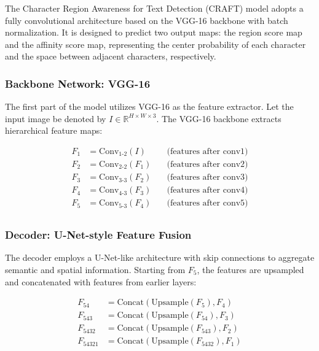 {The Character Region Awareness for Text Detection (CRAFT) model adopts a fully convolutional architecture based on the VGG-16 backbone with batch normalization. It is designed to predict two output maps: the region score map and the affinity score map, representing the center probability of each character and the space between adjacent characters, respectively.

\subsubsection*{Backbone Network: VGG-16}

The first part of the model utilizes VGG-16 \cite{Simonyan} 
as the feature extractor. Let the input image be denoted by 
$I \in \mathbb{R}^{H \times W \times 3}$. The VGG-16 backbone extracts 
hierarchical feature maps:

\[
\begin{aligned}
F_1 &= \text{Conv}_{1\text{-}2}(I) \quad &\text{(features after conv1)} \\
F_2 &= \text{Conv}_{2\text{-}2}(F_1) \quad &\text{(features after conv2)} \\
F_3 &= \text{Conv}_{3\text{-}3}(F_2) \quad &\text{(features after conv3)} \\
F_4 &= \text{Conv}_{4\text{-}3}(F_3) \quad &\text{(features after conv4)} \\
F_5 &= \text{Conv}_{5\text{-}3}(F_4) \quad &\text{(features after conv5)} \\
\end{aligned}
\]

\subsubsection*{Decoder: U-Net-style Feature Fusion}

The decoder employs a U-Net-like architecture \cite{Ronneberger} with skip 
connections to aggregate semantic and spatial information. Starting from $F_5$, 
the features are upsampled and concatenated with features from earlier layers:

\[
\begin{aligned}
F_{54} &= \text{Concat}(\text{Upsample}(F_5), F_4) \\
F_{543} &= \text{Concat}(\text{Upsample}(F_{54}), F_3) \\
F_{5432} &= \text{Concat}(\text{Upsample}(F_{543}), F_2) \\
F_{54321} &= \text{Concat}(\text{Upsample}(F_{5432}), F_1) \\
\end{aligned}
\]

}

